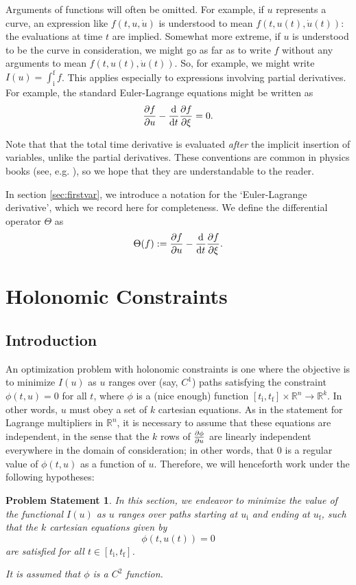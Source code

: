 \documentclass{article}
\theoremstyle{plain}
\theoremstyle{plain}
\theoremstyle{nonumberplain}
\newtheorem{statement}{Problem Statement}
\theoremstyle{empty}
\newcommand{\R}{\mathbb{R}}
\newcommand{\tstart}{\mathrm{i}}
\newcommand{\tend}{\mathrm{f}}
\begin{document}
Arguments of functions will often be omitted. For example, if $u$ represents a curve, an expression like $f(t,u,\dot u)$ is understood to mean $f(t,u(t),\dot u(t))$: the evaluations at time $t$ are implied. Somewhat more extreme, if $u$ is understood to be the curve in consideration, we might go as far as to write $f$ without any arguments to mean $f(t,u(t),\dot u(t))$. So, for example, we might write $I(u) = \int_\tstart^\tend f$. This applies especially to expressions involving partial derivatives. For example, the standard Euler-Lagrange equations might be written as
\[\diffp f u - \diff*{\diffp f \xi}t = 0.\]

Note that that the total time derivative is evaluated \emph{after} the implicit insertion of variables, unlike the partial derivatives. These conventions are common in physics books (see, e.g. \cite{goldstein}), so we hope that they are understandable to the reader.

In section \ref{sec:firstvar}, we introduce a notation for the `Euler-Lagrange derivative', which we record here for completeness. We define the differential operator $\Theta$ as
\[\Theta(f) := \diffp f u - \diff*{\diffp f \xi}t.\]

\section{Holonomic Constraints}

\subsection{Introduction}

An optimization problem with holonomic constraints is one where the objective is to minimize $I(u)$ as $u$ ranges over (say, $C^1$) paths satisfying the constraint $\phi(t, u) = 0$ for all $t$, where $\phi$ is a (nice enough) function $[t_\tstart, t_\tend] \times \R^n \to \R^k$. In other words, $u$ must obey a set of $k$ cartesian equations. As in the statement for Lagrange multipliers in $\R^n$, it is necessary to assume that these equations are independent, in the sense that the $k$ rows of $\diffp \phi u$ are linearly independent everywhere in the domain of consideration; in other words, that 0 is a regular value of $\phi(t, u)$ as a function of $u$. Therefore, we will henceforth work under the following hypotheses:

\begin{statement}
In this section, we endeavor to minimize the value of the functional $I(u)$ as $u$ ranges over paths starting at $u_\tstart$ and ending at $u_\tend$, such that the $k$ cartesian equations given by
\[\phi(t, u(t)) = 0\]
are satisfied for all $t \in [t_\tstart, t_\tend]$.

It is assumed that $\phi$ is a $C^2$ function.
\end{statement}
\end{document}
